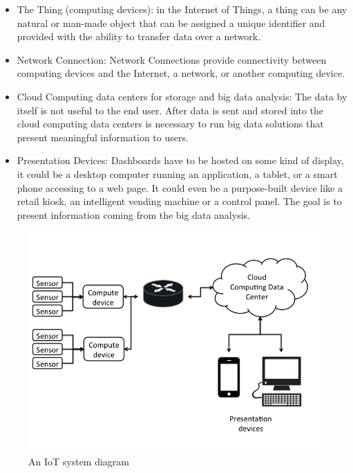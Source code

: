 \begin{itemize} 

\item The Thing (computing devices): in the Internet of Things, a thing can be
any natural or man-made object that can be assigned a unique identifier and
provided with the ability to transfer data over a network. 

\item Network Connection: Network Connections provide connectivity between
computing devices and the Internet, a network, or another computing device. 

\item Cloud Computing data centers for storage and big data analysis: The data
by itself is not useful to the end user. After data is sent and stored into the
cloud computing data centers is necessary to run big data solutions that
present meaningful information to users. 

\item Presentation Devices: Dashboards have to be hosted on some kind of
display, it could be a desktop computer running an application, a tablet, or a
smart phone accessing to a web page. It could even be a purpose-built device
like a retail kiosk, an intelligent vending machine or a control panel. The
goal is to present information coming from the big data analysis. 

\end{itemize}

\begin{figure}[H] \centering
\includegraphics[width=1\textwidth]{images/IoT_diagram.jpg} \caption{An IoT
system diagram } \label{fig:1.1} \end{figure}

